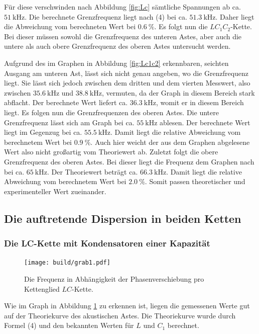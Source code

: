 	 Für diese verschwinden nach Abbildung \ref{fig:Lc} sämtliche Spannungen ab ca.
	  $\SI{51}{\kilo\hertz}$. Die berechnete Grenzfrequenz liegt nach (4) bei
		 ca. $\SI{51,3}{\kilo\hertz}$. Daher liegt die Abweichung vom berechneten Wert bei $\SI{0.6}{\percent}$. Es folgt nun die $LC_1C_2$-Kette. Bei dieser müssen
			 sowohl die Grenzfrequenz des unteren Astes, aber auch die untere als auch obere Grenzfrequenz des
			  oberen Astes untersucht werden.

        

         Aufgrund des im Graphen in Abbildung \ref{fig:Lc1c2} erkennbaren, seichten
				Ausgang am unteren Ast, lässt sich nicht genau angeben, wo die
				 Grenzfrequenz liegt. Sie lässt sich jedoch zwischen dem dritten
				  und dem vierten Messwert, also zwischen $\SI{35,6}{\kilo\hertz}$ und
					$\SI{38,8}{\kilo\hertz}$, vermuten, da der Graph in diesem Bereich
					 stark abflacht. Der berechnete Wert liefert ca. $\SI{36,3}{\kilo\hertz}$,
					  womit er in diesem Bereich liegt.
						 Es folgen nun die Grenzfrequenzen des oberen Astes. Die
						  untere Grenzfrequenz lässt sich am Graph bei ca. $\SI{55}{\kilo\hertz}$
							ablesen. Der berechnete Wert liegt im Gegenzug bei
							 ca. $\SI{55,5}{\kilo\hertz}$. Damit liegt die relative Abweichung vom berechnetem Wert bei $\SI{0.9}{\percent}$. Auch hier weicht der aus dem Graphen abgelesene Wert also nicht
							 großartig vom Theoriewert ab. Zuletzt folgt die obere Grenzfrequenz
							 des oberen Astes. Bei dieser liegt die Frequenz dem Graphen nach bei ca.
							  $\SI{65}{\kilo\hertz}$. Der Theoriewert beträgt ca. $\SI{66,3}{\kilo\hertz}$. Damit liegt die relative Abweichung vom berechnetem Wert bei $\SI{2.0}{\percent}$.
							Somit passen theoretischer und experimenteller Wert zueinander.


\subsection{Die auftretende Dispersion in beiden Ketten}
\subsubsection{Die LC-Kette mit Kondensatoren einer Kapazität}
\begin{figure}[H]
	\centering
	\caption{Die Frequenz in Abhängigkeit der Phasenverschiebung pro Kettenglied $LC$-Kette.}
	\texttt{[image: build/grab1.pdf]}
	\label{fig:grab1}
\end{figure}

Wie im Graph in Abbildung \ref{fig:grab1} zu erkennen ist, liegen die gemessenen Werte gut auf der Theoriekurve des akustischen Astes. Die Theoriekurve wurde durch Formel (4) und den bekannten Werten für $L$ und $C_1$ berechnet.


